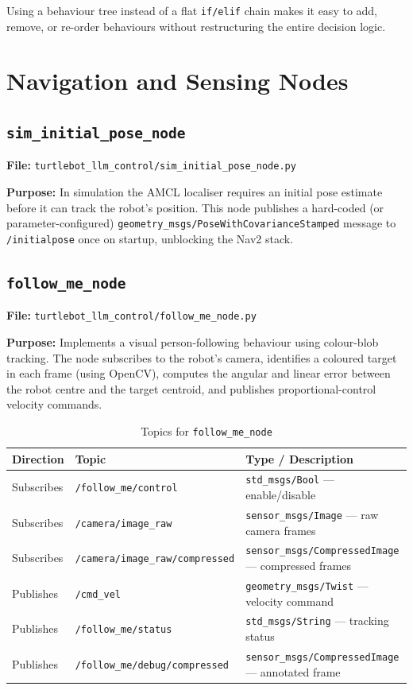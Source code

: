 \documentclass[12pt,a4paper]{report}
\newcommand{\topic}[1]{\texttt{\color{purple!80!black}#1}}
\newcommand{\file}[1]{\texttt{\color{black!70}#1}}
\newcommand{\node}[1]{\texttt{\color{Maroon}#1}}
\begin{document}
Using a behaviour tree instead of a flat \texttt{if/elif} chain makes it easy
to add, remove, or re-order behaviours without restructuring the entire
decision logic.

\section{Navigation and Sensing Nodes}

\subsection{\node{sim\_initial\_pose\_node}}
\label{sub:siposn}

\textbf{File:} \file{turtlebot\_llm\_control/sim\_initial\_pose\_node.py}

\textbf{Purpose:} In simulation the AMCL localiser requires an initial pose
estimate before it can track the robot's position.  This node publishes a
hard-coded (or parameter-configured) \texttt{geometry\_msgs/PoseWithCovarianceStamped}
message to \topic{/initialpose} once on startup, unblocking the Nav2 stack.

\subsection{\node{follow\_me\_node}}
\label{sub:fmn}

\textbf{File:} \file{turtlebot\_llm\_control/follow\_me\_node.py}

\textbf{Purpose:} Implements a visual person-following behaviour using
colour-blob tracking.  The node subscribes to the robot's camera, identifies
a coloured target in each frame (using OpenCV), computes the angular and linear
error between the robot centre and the target centroid, and publishes
proportional-control velocity commands.

\begin{table}[H]
  \centering
  \caption{Topics for \texttt{follow\_me\_node}}
  \begin{tabularx}{\linewidth}{L{3cm} L{5.5cm} X}
    \toprule
    \textbf{Direction} & \textbf{Topic} & \textbf{Type / Description} \\
    \midrule
    Subscribes & \topic{/follow\_me/control}               & \texttt{std\_msgs/Bool} — enable/disable \\
    Subscribes & \topic{/camera/image\_raw}                & \texttt{sensor\_msgs/Image} — raw camera frames \\
    Subscribes & \topic{/camera/image\_raw/compressed}     & \texttt{sensor\_msgs/CompressedImage} — compressed frames \\
    \midrule
    Publishes  & \topic{/cmd\_vel}                         & \texttt{geometry\_msgs/Twist} — velocity command \\
    Publishes  & \topic{/follow\_me/status}                & \texttt{std\_msgs/String} — tracking status \\
    Publishes  & \topic{/follow\_me/debug/compressed}      & \texttt{sensor\_msgs/CompressedImage} — annotated frame \\
    \bottomrule
  \end{tabularx}
\end{table}
\end{document}
